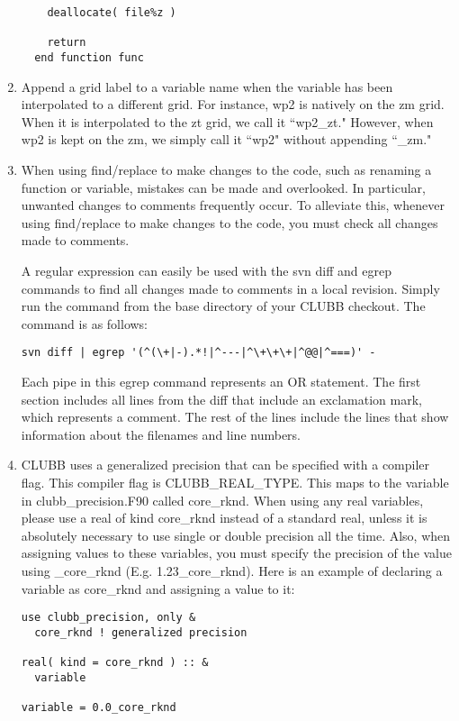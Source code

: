 \documentclass[letterpaper,12pt]{article}
\begin{document}
\begin{enumerate}
\begin{verbatim}
    deallocate( file%z )

    return
  end function func
\end{verbatim}

\item  Append a grid label to a variable name when the variable has been 
interpolated to a different grid.  For instance, wp2 is natively on the zm 
grid.  When it is interpolated to the zt grid, we call it ``wp2\_zt."  
However, when wp2 is kept on the zm, we simply call it ``wp2" without 
appending ``\_zm."

\item  When using find/replace to make changes to the code, such as renaming a function or variable, mistakes can be made and overlooked. In particular, unwanted changes to comments frequently occur. To alleviate this, whenever using find/replace to make changes to the code, you must check all changes made to comments.

A regular expression can easily be used with the svn diff and egrep commands to find all changes made to comments in a local revision. Simply run the command from the base directory of your CLUBB checkout. The command is as follows:

\begin{verbatim}
svn diff | egrep '(^(\+|-).*!|^---|^\+\+\+|^@@|^===)' -
\end{verbatim}

Each pipe in this egrep command represents an OR statement. The first section includes all lines from the diff that include an exclamation mark, which represents a comment. The rest of the lines include the lines that show information about the filenames and line numbers.

\item CLUBB uses a generalized precision that can be specified with a compiler flag. This compiler flag is CLUBB_REAL_TYPE. This maps to the variable in clubb_precision.F90 called core_rknd. When using any real variables, please use a real of kind core_rknd instead of a standard real, unless it is absolutely necessary to use single or double precision all the time. Also, when assigning values to these variables, you must specify the precision of the value using _core_rknd (E.g. 1.23_core_rknd). Here is an example of declaring a variable as core_rknd and assigning a value to it:

\begin{verbatim}
use clubb_precision, only &
  core_rknd ! generalized precision

real( kind = core_rknd ) :: &
  variable

variable = 0.0_core_rknd
\end{verbatim}

\end{enumerate}
\end{document}
